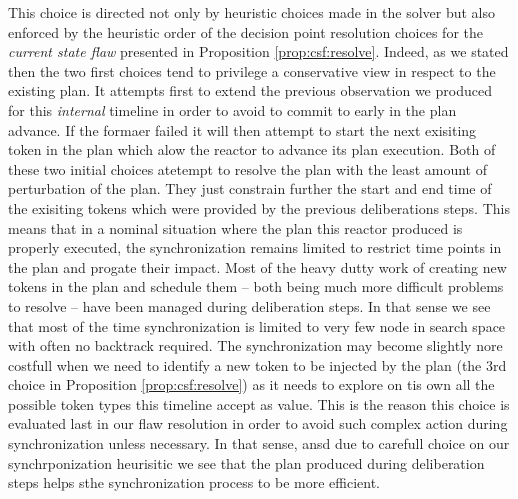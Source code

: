 This choice is directed not only by heuristic choices made in the
solver but also enforced by the heuristic order of the decision point
resolution choices for the {\em current  state flaw} presented in
Proposition \ref{prop:csf:resolve}. Indeed, as we stated then the two
first choices tend to privilege a conservative view in respect to the
existing plan. It attempts first to extend the previous observation we
produced for this {\em internal} timeline in order to avoid to commit
to early in the plan advance. If the formaer failed it will then
attempt to start the next exisiting token in the plan which alow the
reactor to advance its plan execution. Both of these two initial
choices atetempt to resolve the plan with the least amount of
perturbation of the plan. They just constrain further the start and
end time of the exisiting tokens which were provided by the previous 
deliberations steps. This means that in a nominal situation where the
plan this reactor produced is properly executed, the synchronization
remains limited to restrict time points in the plan and progate their
impact. Most of the heavy dutty work of creating new tokens in the
plan and schedule them -- both being much more difficult problems 
to resolve -- have been managed during deliberation steps. In that
sense we see that most of the time synchronization is limited to very
few node in \eu search space with often no backtrack required. The
synchronization may become slightly nore costfull when we need to
identify a new token to be injected by the plan (the 3rd choice in
Proposition \ref{prop:csf:resolve}) as it needs to explore on tis own
all the possible token types this timeline accept as value. This is
the reason this choice is evaluated last in our flaw resolution in
order to avoid such complex action during synchronization unless 
necessary. In that sense,  ansd due to carefull choice on our
synchrponization heurisitic we see that the plan produced during \rx
deliberation steps helps sthe synchronization process to be more
efficient. 



